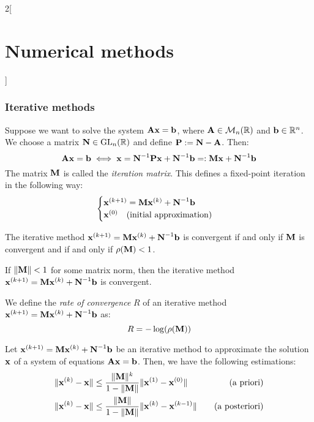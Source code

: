 \documentclass[../../../main.tex]{subfiles}
\begin{document}
\begin{multicols}{2}[\section{Numerical methods}]
  \subsubsection{Iterative methods}
  \begin{definition}
    Suppose we want to solve the system $\vf{A}\vf{x}=\vf{b}$, where $\vf{A}\in\mathcal{M}_n(\RR)$ and $\vf{b}\in\RR^n$. We choose a matrix $\vf{N}\in\GL_n(\RR)$ and define $\vf{P}:=\vf{N}-\vf{A}$. Then: $$\vf{A}\vf{x}=\vf{b}\iff \vf{x}=\vf{N}^{-1}\vf{P}\vf{x}+\vf{N}^{-1}\vf{b}=:\vf{M}\vf{x}+\vf{N}^{-1}\vf{b}$$ The matrix $\vf{M}$ is called the \emph{iteration matrix}. This defines a fixed-point iteration in the following way:
    \begin{equation*}
      \begin{cases}
        \vf{x}^{(k+1)}=\vf{M}\vf{x}^{(k)}+\vf{N}^{-1}\vf{b} \\
        \vf{x}^{(0)}\quad\text{(initial approximation)}
      \end{cases}
    \end{equation*}
  \end{definition}
  \begin{theorem}
    The iterative method $\vf{x}^{(k+1)}=\vf{M}\vf{x}^{(k)}+\vf{N}^{-1}\vf{b}$ is convergent if and only if $\vf{M}$ is convergent and if and only if $\rho(\vf{M})<1$.
  \end{theorem}
  \begin{corollary}
    If $\|\vf{M}\|<1$ for some matrix norm, then the iterative method $\vf{x}^{(k+1)}=\vf{M}\vf{x}^{(k)}+\vf{N}^{-1}\vf{b}$ is convergent.
  \end{corollary}
  \begin{definition}
    We define the \emph{rate of convergence} $R$ of an iterative method $\vf{x}^{(k+1)}=\vf{M}\vf{x}^{(k)}+\vf{N}^{-1}\vf{b}$ as: $$R=-\log(\rho(\vf{M}))$$
  \end{definition}
  \begin{proposition}
    Let $\vf{x}^{(k+1)}=\vf{M}\vf{x}^{(k)}+\vf{N}^{-1}\vf{b}$ be an iterative method to approximate the solution $\vf{x}$ of a system of equations $\vf{A}\vf{x}=\vf{b}$. Then, we have the following estimations:
    \begin{align*}
      \|\vf{x}^{(k)}-\vf{x}\| & \leq\frac{\|\vf{M}\|^k}{1-\|\vf{M}\|}\|\vf{x}^{(1)}-\vf{x}^{(0)}\|\quad & \text{(a priori)}     \\
      \|\vf{x}^{(k)}-\vf{x}\| & \leq\frac{\|\vf{M}\|}{1-\|\vf{M}\|}\|\vf{x}^{(k)}-\vf{x}^{(k-1)}\|\quad & \text{(a posteriori)}
    \end{align*}

\end{proposition}
\end{multicols}
\end{document}

